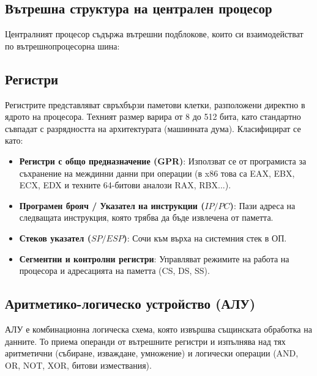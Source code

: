 \documentclass{scrartcl}
\begin{document}
\begin{FlushLeft}
\section{Вътрешна структура на централен процесор} 

Централният процесор съдържа вътрешни подблокове, които си взаимодействат по вътрешнопроцесорна шина:

\subsection{Регистри} 
Регистрите представляват свръхбързи паметови клетки, разположени директно в ядрото на процесора. Техният размер варира от 8 до 512 бита, като стандартно съвпадат с разрядността на архитектурата (машинната дума). Класифицират се като:
\begin{itemize}
    \item \textbf{Регистри с общо предназначение (GPR)}: Използват се от програмиста за съхранение на междинни данни при операции (в x86 това са EAX, EBX, ECX, EDX и техните 64-битови аналози RAX, RBX...).
    \item \textbf{Програмен брояч / Указател на инструкции ($IP / PC$)}: Пази адреса на следващата инструкция, която трябва да бъде извлечена от паметта.
    \item \textbf{Стеков указател ($SP / ESP$)}: Сочи към върха на системния стек в ОП.
    \item \textbf{Сегментни и контролни регистри}: Управляват режимите на работа на процесора и адресацията на паметта (CS, DS, SS).
\end{itemize}

\subsection{Аритметико-логическо устройство (АЛУ)} 
АЛУ е комбинационна логическа схема, която извършва същинската обработка на данните. То приема операнди от вътрешните регистри и изпълнява над тях аритметични (събиране, изваждане, умножение) и логически операции (AND, OR, NOT, XOR, битови измествания).


\end{FlushLeft}
\end{document}
